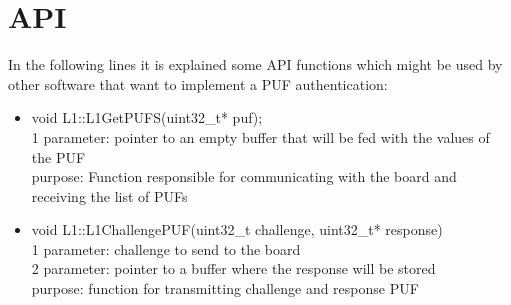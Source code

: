 \chapter{API}
\label{api}

In the following lines it is explained some API functions which might be used by other software that want to implement a PUF authentication:
\begin{itemize}
	\item void L1::L1GetPUFS(uint32\_t* puf);
		\\
		1 parameter: pointer to an empty buffer that will be fed with the values of the PUF
		\\
		purpose: Function responsible for communicating with the board and receiving the list of PUFs
		
	\item void L1::L1ChallengePUF(uint32\_t challenge, uint32\_t* response)
		\\
		1 parameter: challenge to send to the board
		\\
		2 parameter: pointer to a buffer where the response will be stored	
		\\
		purpose: function for transmitting challenge and response PUF
\end{itemize}